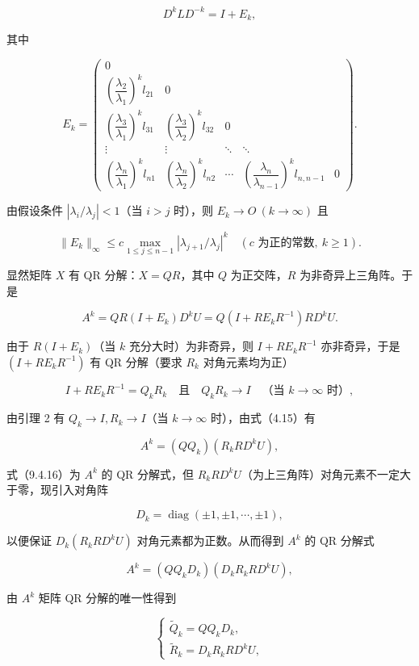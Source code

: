 \documentclass[
  10pt,
  fontset=fandol]{ctexart}
\begin{document}
\[
D^kLD^{-k}=I+E_k,
\]

其中

\[
E_k=\begin{pmatrix}
0&&&&\\
\left(\dfrac{\lambda_2}{\lambda_1}\right)^k l_{21}&0&&&\\
\left(\dfrac{\lambda_3}{\lambda_1}\right)^k l_{31}&\left(\dfrac{\lambda_3}{\lambda_2}\right)^k l_{32}&0&&\\
\vdots&\vdots&\ddots&\ddots&\\
\left(\dfrac{\lambda_n}{\lambda_1}\right)^k l_{n1}&\left(\dfrac{\lambda_n}{\lambda_2}\right)^k l_{n2}&\cdots&\left(\dfrac{\lambda_n}{\lambda_{n-1}}\right)^k l_{n,n-1}&0
\end{pmatrix}.
\]

由假设条件 \(|\lambda_i/\lambda_j|<1\)（当 \(i>j\) 时），则 \(E_k\to O\ (k\to\infty)\) 且

\[
\|E_k\|_\infty\leq c\max_{1\leq j\leq n-1}|\lambda_{j+1}/\lambda_j|^k
\quad(c\text{ 为正的常数},\ k\geq1).
\tag{9.4.14}
\]

显然矩阵 \(X\) 有 QR 分解：\(X=QR\)，其中 \(Q\) 为正交阵，\(R\) 为非奇异上三角阵。于是

\[
A^k=QR(I+E_k)D^kU=Q(I+RE_kR^{-1})RD^kU.
\tag{9.4.15}
\]

由于 \(R(I+E_k)\)（当 \(k\) 充分大时）为非奇异，则 \(I+RE_kR^{-1}\) 亦非奇异，于是 \((I+RE_kR^{-1})\) 有 QR 分解（要求 \(R_k\) 对角元素均为正）

\[
I+RE_kR^{-1}=Q_kR_k\quad\text{且}\quad Q_kR_k\to I\quad\text{（当 }k\to\infty\text{ 时）},
\]

由引理 2 有 \(Q_k\to I,R_k\to I\)（当 \(k\to\infty\) 时），由式（4.15）有

\[
A^k=(QQ_k)(R_kRD^kU),
\tag{9.4.16}
\]

式（9.4.16）为 \(A^k\) 的 QR 分解式，但 \(R_kRD^kU\)（为上三角阵）对角元素不一定大于零，现引入对角阵

\[
D_k=\operatorname{diag}(\pm1,\pm1,\cdots,\pm1),
\]

以便保证 \(D_k(R_kRD^kU)\) 对角元素都为正数。从而得到 \(A^k\) 的 QR 分解式

\[
A^k=(QQ_kD_k)(D_kR_kRD^kU),
\]

由 \(A^k\) 矩阵 QR 分解的唯一性得到

\[
\begin{cases}
\widetilde Q_k=QQ_kD_k,\\
\widetilde R_k=D_kR_kRD^kU,
\end{cases}
\tag{9.4.17}
\]
\end{document}
